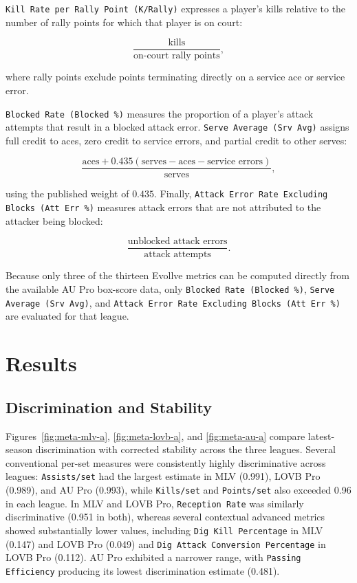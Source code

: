 \documentclass[10pt]{article}
\begin{document}
\texttt{Kill Rate per Rally Point (K/Rally)} expresses a player's kills relative to the number of rally points for which that player is on court:

\[
\frac{
\text{kills}
}{
\text{on-court rally points}
},
\]

where rally points exclude points terminating directly on a service ace or service error.

\texttt{Blocked Rate (Blocked \%)} measures the proportion of a player's attack attempts that result in a blocked attack error.
\texttt{Serve Average (Srv Avg)} assigns full credit to aces, zero credit to service errors, and partial credit to other serves:

\[
\frac{
\text{aces}
+
0.435(\text{serves}-\text{aces}-\text{service errors})
}{
\text{serves}
},
\]

using the published weight of $0.435$.
Finally, \texttt{Attack Error Rate Excluding Blocks (Att Err \%)} measures attack errors that are not attributed to the attacker being blocked:

\[
\frac{
\text{unblocked attack errors}
}{
\text{attack attempts}
}.
\]

Because only three of the thirteen Evollve metrics can be computed directly from the available AU Pro box-score data, only \texttt{Blocked Rate (Blocked \%)}, \texttt{Serve Average (Srv Avg)}, and \texttt{Attack Error Rate Excluding Blocks (Att Err \%)} are evaluated for that league.

\section{Results}

\subsection{Discrimination and Stability}

Figures~\ref{fig:meta-mlv-a}, \ref{fig:meta-lovb-a}, and \ref{fig:meta-au-a} compare latest-season discrimination with corrected stability across the three leagues.
Several conventional per-set measures were consistently highly discriminative across leagues: \texttt{Assists/set} had the largest estimate in MLV (0.991), LOVB Pro (0.989), and AU Pro (0.993), while \texttt{Kills/set} and \texttt{Points/set} also exceeded 0.96 in each league.
In MLV and LOVB Pro, \texttt{Reception Rate} was similarly discriminative (0.951 in both), whereas several contextual advanced metrics showed substantially lower values, including \texttt{Dig Kill Percentage} in MLV (0.147) and LOVB Pro (0.049) and \texttt{Dig Attack Conversion Percentage} in LOVB Pro (0.112).
AU Pro exhibited a narrower range, with \texttt{Passing Efficiency} producing its lowest discrimination estimate (0.481). \\
\end{document}
